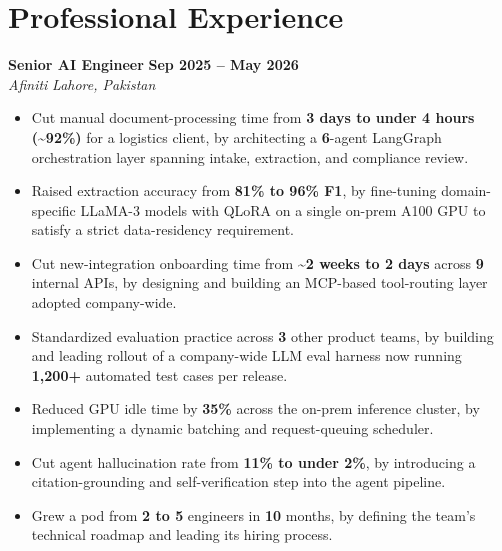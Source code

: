 \documentclass[10.5pt,letterpaper]{article}
\newcommand{\jobheader}[4]{%
  \textbf{#1} \hfill \textbf{#2}\\
  \textit{#3} \hfill \textit{#4}%
}
\begin{document}
\section*{Professional Experience}

\jobheader{Senior AI Engineer}{Sep 2025 -- May 2026}{Afiniti}{Lahore, Pakistan}
\begin{itemize}
  \item Cut manual document-processing time from \textbf{3 days to under 4 hours (\textasciitilde92\%)} for a logistics client, by architecting a \textbf{6}-agent LangGraph orchestration layer spanning intake, extraction, and compliance review.
  \item Raised extraction accuracy from \textbf{81\% to 96\% F1}, by fine-tuning domain-specific LLaMA-3 models with QLoRA on a single on-prem A100 GPU to satisfy a strict data-residency requirement.
  \item Cut new-integration onboarding time from \textbf{\textasciitilde2 weeks to 2 days} across \textbf{9} internal APIs, by designing and building an MCP-based tool-routing layer adopted company-wide.
  \item Standardized evaluation practice across \textbf{3} other product teams, by building and leading rollout of a company-wide LLM eval harness now running \textbf{1,200+} automated test cases per release.
  \item Reduced GPU idle time by \textbf{35\%} across the on-prem inference cluster, by implementing a dynamic batching and request-queuing scheduler.
  \item Cut agent hallucination rate from \textbf{11\% to under 2\%}, by introducing a citation-grounding and self-verification step into the agent pipeline.
  \item Grew a pod from \textbf{2 to 5} engineers in \textbf{10} months, by defining the team's technical roadmap and leading its hiring process.
\end{itemize}
\end{document}
